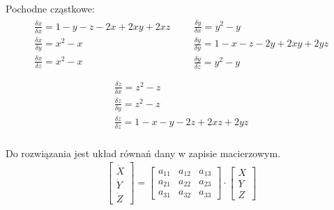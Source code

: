 Pochodne cząstkowe:
\begin{align*}
\begin{array}{l}
\frac{\delta \dot{x}}{\delta x} = 1-y-z-2x+2xy+2xz\\
\frac{\delta \dot{x}}{\delta y} = x^2 - x\\
\frac{\delta \dot{x}}{\delta z} = x^2 - x\\
\end{array}
&&
\begin{array}{l}
\frac{\delta \dot{y}}{\delta x} = y^2 - y\\
\frac{\delta \dot{y}}{\delta y} = 1-x-z-2y+2xy+2yz\\
\frac{\delta \dot{y}}{\delta z} = y^2 - y\\
\end{array}
\end{align*}
\begin{align*}
\begin{array}{l}
\frac{\delta \dot{z}}{\delta x} = z^2 - z\\
\frac{\delta \dot{z}}{\delta y} = z^2 - z\\
\frac{\delta \dot{z}}{\delta z} = 1-x-y-2z+2xz+2yz\\
\end{array}
\end{align*}

Do rozwiązania jest układ równań dany w zapisie macierzowym.
\begin{align}\label{eq:uklad_rown_stab}
\left[ \begin{array}{c}
\dot{X} \\
\dot{Y} \\
\dot{Z}
\end{array}
\right] = 
\left[
\begin{array}{ccc}
a_{11} & a_{12} & a_{13} \\
a_{21} & a_{22} & a_{23} \\
a_{31} & a_{32} & a_{33}
\end{array}
\right] \cdot 
\left[
\begin{array}{c}
X\\
Y\\
Z
\end{array}
\right]
\end{align}

